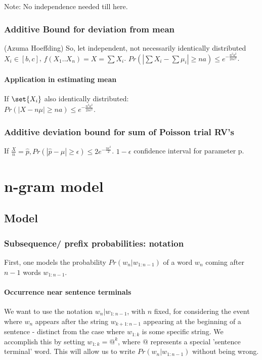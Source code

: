 \documentclass[oneside, article]{memoir}
\begin{document}
Note: No independence needed till here.

\subsubsection{Additive Bound for deviation from mean}
(Azuma Hoeffding) So, let independent, not necessarily identically distributed $X_{i} \in [b, c]$, $f(X_{1}..X_{n}) = X = \sum X_{i}$. $Pr(|\sum X_i - \sum \mu_i| \geq na)\leq e^{-\frac{n^{2}a^{2}}{2nc^{2}}}$.

\paragraph*{Application in estimating mean}
If $\set{X_i}$ also identically distributed:\\
 $Pr(|X - n\mu| \geq na)\leq e^{-\frac{n^{2}a^{2}}{2nc^{2}}}$.

\subsubsection{Additive deviation bound for sum of Poisson trial RV's}
If $\frac{X}{n} = \hat{p}, Pr(|\hat{p} - \mu| \geq \epsilon) \leq 2e^{-\frac{n\epsilon^{2}}{2}}$. $1-\epsilon$ confidence interval for parameter p.

\section{n-gram model}
\subsection{Model}
\subsubsection{Subsequence/ prefix probabilities: notation}
First, one models the probability $Pr(w_n|w_{1:n-1})$ of a word $w_n$ coming after $n-1$ words $w_{1:n-1}$.

\paragraph{Occurrence near sentence terminals}
We want to use the notation $w_n|w_{1:n-1}$, with $n$ fixed, for considering the event where $w_n$ appears after the string $w_{k+1:n-1}$ appearing at the beginning of a sentence - distinct from the case where $w_{1:k}$ is some specific string. We accomplish this by setting $w_{1:k} = @^k$, where $@$ represents a special 'sentence terminal' word. This will allow us to write $Pr(w_n|w_{1:n-1})$ without being wrong.
\end{document}
